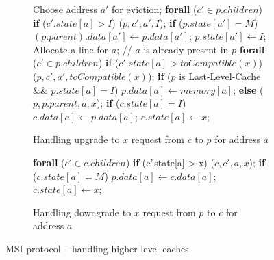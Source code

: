 \begin{figure}
\small

\begin{subfigure}{\linewidth}
\begin{boxedminipage}{\linewidth}
\begin{algorithmic}
        \State Choose address $a'$ for eviction;
        \State \textbf{forall} ($c' \in p.children$)
        \State \;\;\;\; \textbf{if} ($c'.state[a] > I$)
        \State \;\;\;\;\;\;\;\; \call{} \dReq($p, c', a', I$);
          \State \textbf{if} ($p.state[a'] = M$)
          \State \;\;\;\; $(p.parent).data[a'] \gets p.data[a']$;
          \State $p.state[a'] \gets I$;
        \EndIf
      \EndIf
      \State Allocate a line for $a$;
    \EndIf
    \State // $a$ is already present in $p$
    \State \textbf{forall} ($c' \in p.children$)
    \State \;\;\;\; \textbf{if} ($c'.state[a] > toCompatible(x)$)
    \State \;\;\;\;\;\;\;\; \call{} \dReq($p, c', a', toCompatible(x)$);
    \State \textbf{if} ($p$ is Last-Level-Cache \&\& $p.state[a] = I$)
    \State \;\;\;\; $p.data[a] \gets memory[a]$;
    \State \textbf{else}
    \State \;\;\;\; \call{} \uReq($p, p.parent, a, x$);
    \State \textbf{if} ($c.state[a] = I$)
    \State \;\;\;\; $c.data[a] \gets p.data[a]$;
    \State $c.state[a] \gets x$;
  \EndIf
\EndProc
\end{algorithmic}
\end{boxedminipage}
\caption{Handling upgrade to $x$ request from $c$ to $p$ for address $a$}
\label{uReq1Core}
\end{subfigure}

\begin{subfigure}{\linewidth}
\begin{boxedminipage}{\linewidth}
\begin{algorithmic}
  \State \textbf{forall} ($c' \in c.children$)
  \State \;\;\;\; \textbf{if} (c'.state[a] > x)
  \State \;\;\;\;\;\;\;\; \call{} \dReq($c, c', a, x$);
  \State \textbf{if} ($c.state[a] = M$)
  \State \;\;\;\; $p.data[a] \gets c.data[a]$;
  \State $c.state[a] \gets x$;
\EndProc
\end{algorithmic}
\end{boxedminipage}
\caption{Handling downgrade to $x$ request from $p$ to $c$ for address $a$}
\label{dReq1Core}
\end{subfigure}

\caption{MSI protocol -- handling higher level caches}
\label{msi-simple-core}
\end{figure}


